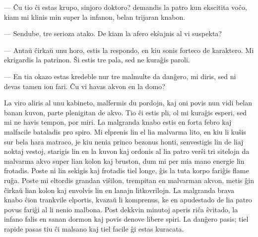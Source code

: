  --- \^Cu tio \^ci estas krupo, sinjoro doktoro? demandis la patro kun
ekscitita vo\^co, kiam mi klinis min super la infanon, belan
trijaran knabon.

 --- Sendube, tre serioza atako. De kiam la afero ek\^sajnis al vi
suspekta?

 --- Anta\u u \^cirka\u u unu horo, estis la respondo, en kiu sonis forteco
de karaktero. Mi ekrigardis la patrinon. \^Si estis tre pala, sed ne
kura\^gis paroli.

 --- En tia okazo estas kredeble nur tre malmulte da dan\^gero, mi
diris, sed ni devas tamen ion fari. \^Cu vi havas akvon en la domo?

   La viro aliris al unu kabineto, malfermis du pordojn, kaj oni
povis nun vidi belan banan kuvon, parte plenigitan de akvo. Tio \^ci
estis pli, ol mi kura\^gis esperi, sed mi ne havis tempon, por miri.
La malgranda knabo estis en forta febro kaj malfacile bataladis pro
spiro. Mi elprenis lin el lia malvarma lito, en kiu li ku\^sis sur
bela hara matraco, je kiu nenia princo bezonus honti, senvestigis
lin de liaj noktaj vestoj, starigis lin en la kuvon kaj ordonis al
lia patro ver\^si tri sitelojn da malvarma akvo super lian kolon kaj
bruston, dum mi per mia mano energie lin frotadis. Poste ni lin
sekigis kaj frotadis tiel longe, \^gis la tuta korpo fari\^gis flame
ru\^ga. Poste mi eltordis grandan vi\^silon, trempitan en malvarman
akvon, metis \^gin \^cirka\u u lian kolon kaj envolvis lin en lanajn
litkovrilojn. La malgranda brava knabo \^cion trankvile elportis,
kvaza\u u li komprenus, ke en apudestado de lia patro povus fari\^gi
al li nenio malbona. Post dekkvin minutoj aperis ri\^ca \^svitado,
la infano falis en sanan dormon kaj povis denove libere spiri. La
dan\^gero pasis; tiel rapide pasas tiu \^ci malsano kaj tiel facile
\^gi estas kuracata.

